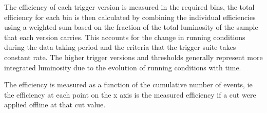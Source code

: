 The efficiency of each trigger version is measured in the required \HT bins, 
the total efficiency for each \HT bin is then calculated by combining the 
individual efficiencies using a weighted sum based on the fraction of 
the total luminosity of the sample that each version carries. This accounts for 
the change in running conditions during the data taking period and the criteria 
that the trigger suite takes constant rate. The higher trigger versions and 
thresholds generally represent more integrated luminosity due to the evolution 
of running conditions with time.

The efficiency is measured as a function of the cumulative number of events, ie 
the efficiency at each point on the x axis is the measured efficiency if a cut 
were applied offline at that cut value.

\begin{table}
    \centering
\footnotesize
\begin{tabular}{|c|c|c|}
  

\end{tabular}
\end{table}
